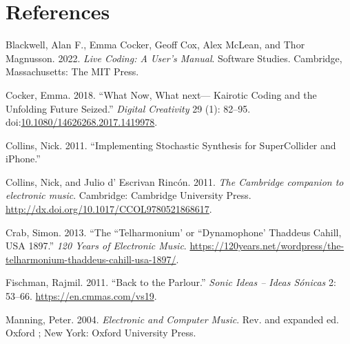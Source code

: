 \documentclass[11pt]{article}
\begin{document}
\section*{References}
\label{bibliography}


\hypertarget{citeproc_bib_item_1}{Blackwell, Alan F., Emma Cocker, Geoff Cox, Alex McLean, and Thor Magnusson. 2022. \textit{Live Coding: A User’s Manual}. Software Studies. Cambridge, Massachusetts: The MIT Press.}

\hypertarget{citeproc_bib_item_2}{Cocker, Emma. 2018. “What Now, What next— Kairotic Coding and the Unfolding Future Seized.” \textit{Digital Creativity} 29 (1): 82–95. doi:\href{https://doi.org/10.1080/14626268.2017.1419978}{10.1080/14626268.2017.1419978}.}

\hypertarget{citeproc_bib_item_3}{Collins, Nick. 2011. “Implementing Stochastic Synthesis for SuperCollider and iPhone.”}

\hypertarget{citeproc_bib_item_4}{Collins, Nick, and Julio d’ Escrivan Rincón. 2011. \textit{The Cambridge companion to electronic music}. Cambridge: Cambridge University Press. \url{http://dx.doi.org/10.1017/CCOL9780521868617}.}

\hypertarget{citeproc_bib_item_5}{Crab, Simon. 2013. “The “Telharmonium’ or “Dynamophone’ Thaddeus Cahill, USA 1897.” \textit{120 Years of Electronic Music}. \url{https://120years.net/wordpress/the-telharmonium-thaddeus-cahill-usa-1897/}.}

\hypertarget{citeproc_bib_item_6}{Fischman, Rajmil. 2011. “Back to the Parlour.” \textit{Sonic Ideas – Ideas Sónicas} 2: 53–66. \url{https://en.cmmas.com/vs19}.}

\hypertarget{citeproc_bib_item_7}{Manning, Peter. 2004. \textit{Electronic and Computer Music}. Rev. and expanded ed. Oxford ; New York: Oxford University Press.}
\end{document}
